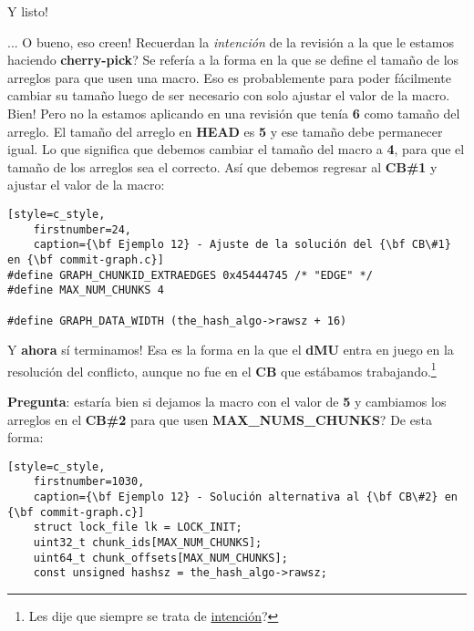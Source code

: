 Y listo!

... O bueno, eso creen! Recuerdan la {\it intención} de la revisión a la que le estamos haciendo {\bf cherry-pick}?
Se refería a la forma en la que se define el tamaño de los arreglos para que usen una macro. Eso es probablemente para poder
fácilmente cambiar su tamaño luego de ser necesario con solo ajustar el valor de la macro. Bien! Pero no la estamos aplicando
en una revisión que tenía {\bf 6} como tamaño del arreglo. El tamaño del arreglo en {\bf HEAD} es {\bf 5} y ese tamaño debe
permanecer igual. Lo que significa que debemos cambiar el tamaño del macro a {\bf 4}, para que el tamaño de los arreglos sea el
correcto. Así que debemos regresar al {\bf CB\#1} y ajustar el valor de la macro:

\begin{lstlisting}[style=c_style,
	firstnumber=24,
	caption={\bf Ejemplo 12} - Ajuste de la solución del {\bf CB\#1} en {\bf commit-graph.c}]
#define GRAPH_CHUNKID_EXTRAEDGES 0x45444745 /* "EDGE" */
#define MAX_NUM_CHUNKS 4

#define GRAPH_DATA_WIDTH (the_hash_algo->rawsz + 16)
\end{lstlisting}

Y {\bf ahora} sí terminamos! Esa es la forma en la que el {\bf dMU} entra en juego en la resolución del conflicto, aunque no
fue en el {\bf CB} que estábamos trabajando.\footnote{Les dije que siempre se trata de \hyperref[intent]{intención}?}

{\bf Pregunta}: estaría bien si dejamos la macro con el valor de {\bf 5} y cambiamos los arreglos en el {\bf CB\#2} para que
usen {\bf MAX\_NUMS\_CHUNKS}?
De esta forma:

\begin{lstlisting}[style=c_style,
	firstnumber=1030,
	caption={\bf Ejemplo 12} - Solución alternativa al {\bf CB\#2} en {\bf commit-graph.c}]
	struct lock_file lk = LOCK_INIT;
	uint32_t chunk_ids[MAX_NUM_CHUNKS];
	uint64_t chunk_offsets[MAX_NUM_CHUNKS];
	const unsigned hashsz = the_hash_algo->rawsz;
\end{lstlisting}

